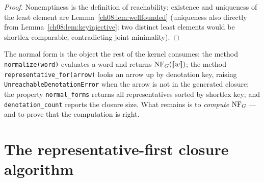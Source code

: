 \begin{proof}
Nonemptiness is the definition of reachability; existence and uniqueness of
the least element are Lemma~\ref{ch08:lem:wellfounded} (uniqueness also
directly from Lemma~\ref{ch08:lem:keyinjective}: two distinct least elements
would be shortlex-comparable, contradicting joint minimality).
\end{proof}

The normal form is the object the rest of the kernel consumes: the method
\texttt{normalize(word)} evaluates a word and returns
$\mathrm{NF}_G([\![ w]\!])$; the method
\texttt{representative\_for(arrow)} looks an arrow up by denotation key,
raising \texttt{UnreachableDenotationError} when the arrow is not in the
generated closure; the property \texttt{normal\_forms} returns all
representatives sorted by shortlex key; and \texttt{denotation\_count}
reports the closure size. What remains is to \emph{compute} $\mathrm{NF}_G$ --- and
to prove that the computation is right.

\section{The representative-first closure algorithm}\label{ch08:sec:algorithm}

